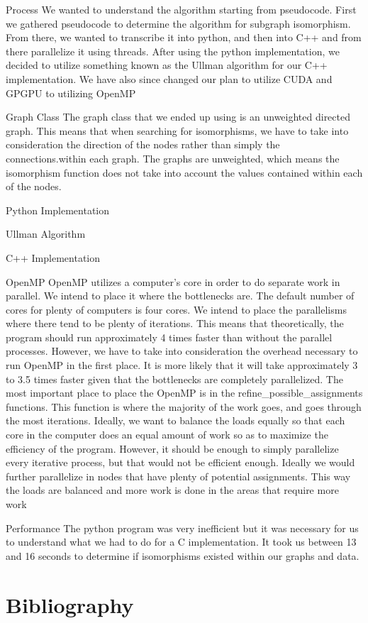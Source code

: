 \documentclass{article}
\begin{document}
Process
We wanted to understand the algorithm starting from pseudocode. First we gathered pseudocode to determine the algorithm for subgraph isomorphism. From there, we wanted to transcribe it into python, and then into C++ and from there parallelize it using threads. After using the python implementation, we decided to utilize something known as the Ullman algorithm for our C++ implementation. We have also since changed our plan to utilize CUDA and GPGPU to utilizing OpenMP

Graph Class
The graph class that we ended up using is an unweighted directed graph. This means that when searching for isomorphisms, we have to take into consideration the direction of the nodes rather than simply the connections.within each graph. The graphs are unweighted, which means the isomorphism function does not take into account the values contained within each of the nodes. 

Python Implementation

Ullman Algorithm

C++ Implementation

OpenMP
OpenMP utilizes a computer’s core in order to do separate work in parallel. We intend to place it where the bottlenecks are. The default number of cores for plenty of computers is four cores. We intend to place the parallelisms where there tend to be plenty of iterations. This means that theoretically, the program should run approximately 4 times faster than without the parallel processes. However, we have to take into consideration the overhead necessary to run OpenMP in the first place. It is more likely that it will take approximately 3 to 3.5 times faster given that the bottlenecks are completely parallelized. The most important place to place the OpenMP is in the refine\_possible\_assignments functions. This function is where the majority of the work goes, and goes through the most iterations. Ideally, we want to  balance the loads equally so that each core in the computer does an equal amount of work so as to maximize the efficiency of the program. However, it should be enough to simply parallelize every iterative process, but that would not be efficient enough. Ideally we would further parallelize in nodes that have plenty of potential assignments. This way the loads are balanced and more work is done in the areas that require more work

Performance
The python program was very inefficient but it was necessary for us to understand what we had to do for a C implementation. It took us between 13 and 16 seconds to determine if isomorphisms existed within our graphs and data.
  \section{Bibliography}
\end{document}
